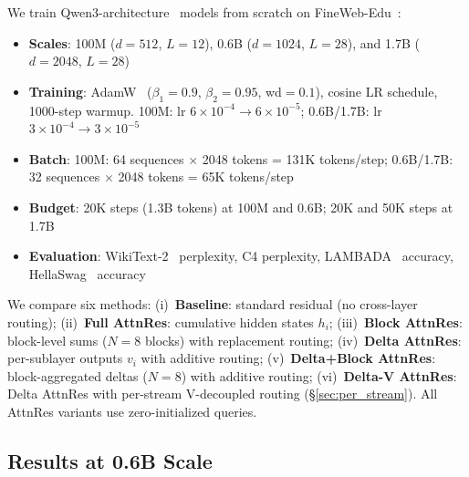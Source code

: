 \documentclass{article}
\begin{document}
We train Qwen3-architecture~\citep{qwen2025qwen3} models from scratch on FineWeb-Edu~\citep{penedo2024fineweb}:
\begin{itemize}
    \item \textbf{Scales}: 100M ($d{=}512$, $L{=}12$), 0.6B ($d{=}1024$, $L{=}28$), and 1.7B ($d{=}2048$, $L{=}28$)
    \item \textbf{Training}: AdamW~\citep{loshchilov2019adamw} ($\beta_1{=}0.9$, $\beta_2{=}0.95$, wd${=}0.1$), cosine LR schedule, 1000-step warmup. 100M: lr $6{\times}10^{-4} \to 6{\times}10^{-5}$; 0.6B/1.7B: lr $3{\times}10^{-4} \to 3{\times}10^{-5}$
    \item \textbf{Batch}: 100M: 64 sequences $\times$ 2048 tokens = 131K tokens/step; 0.6B/1.7B: 32 sequences $\times$ 2048 tokens = 65K tokens/step
    \item \textbf{Budget}: 20K steps (1.3B tokens) at 100M and 0.6B; 20K and 50K steps at 1.7B
    \item \textbf{Evaluation}: WikiText-2~\citep{merity2017wikitext} perplexity, C4 perplexity, LAMBADA~\citep{paperno2016lambada} accuracy, HellaSwag~\citep{zellers2019hellaswag} accuracy
\end{itemize}

We compare six methods: (i)~\textbf{Baseline}: standard residual (no cross-layer routing); (ii)~\textbf{Full AttnRes}: cumulative hidden states $h_i$; (iii)~\textbf{Block AttnRes}: block-level sums ($N{=}8$ blocks) with replacement routing; (iv)~\textbf{Delta AttnRes}: per-sublayer outputs $v_i$ with additive routing; (v)~\textbf{Delta+Block AttnRes}: block-aggregated deltas ($N{=}8$) with additive routing; (vi)~\textbf{Delta-V AttnRes}: Delta AttnRes with per-stream V-decoupled routing (\S\ref{sec:per_stream}). All AttnRes variants use zero-initialized queries.

\subsection{Results at 0.6B Scale}
\end{document}
